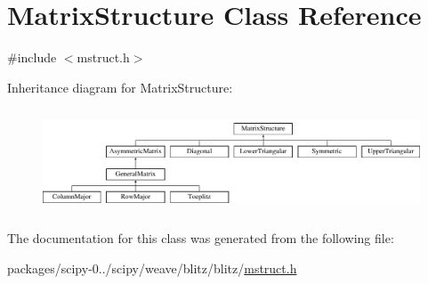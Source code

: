 \hypertarget{classMatrixStructure}{}\section{Matrix\+Structure Class Reference}
\label{classMatrixStructure}


{\ttfamily \#include $<$mstruct.\+h$>$}

Inheritance diagram for Matrix\+Structure\+:\begin{figure}[H]
\begin{center}
\leavevmode
\includegraphics[height=3.111111cm]{classMatrixStructure}
\end{center}
\end{figure}


The documentation for this class was generated from the following file\+:\begin{DoxyCompactItemize}
\item 
packages/scipy-\/0../scipy/weave/blitz/blitz/\hyperlink{mstruct_8h}{mstruct.\+h}\end{DoxyCompactItemize}

